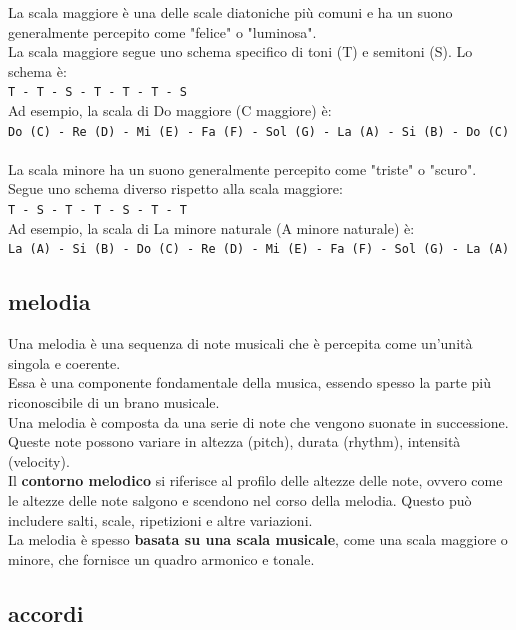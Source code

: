 \documentclass[a4paper,12pt]{report}
\begin{document}
La scala maggiore è una delle scale diatoniche più comuni e ha un suono generalmente percepito come "felice" o "luminosa". \\
La scala maggiore segue uno schema specifico di toni (T) e semitoni (S). Lo schema è: \\
\texttt{T - T - S - T - T - T - S} \\
Ad esempio, la scala di Do maggiore (C maggiore) è: \\
\texttt{Do (C) - Re (D) - Mi (E) - Fa (F) - Sol (G) - La (A) - Si (B) - Do (C)} \\
\\
La scala minore ha un suono generalmente percepito come "triste" o "scuro".  \\
Segue uno schema diverso rispetto alla scala maggiore: \\
\texttt{T - S - T - T - S - T - T} \\
Ad esempio, la scala di La minore naturale (A minore naturale) è: \\
\texttt{La (A) - Si (B) - Do (C) - Re (D) - Mi (E) - Fa (F) - Sol (G) - La (A)} \\

\subsection{melodia}

Una melodia è una sequenza di note musicali che è percepita come un'unità singola e coerente. \\
Essa è una componente fondamentale della musica, essendo spesso la parte più riconoscibile di un brano musicale. \\
Una melodia è composta da una serie di note che vengono suonate in successione. Queste note possono variare in altezza (pitch), durata (rhythm), intensità (velocity). \\
Il \textbf{contorno melodico} si riferisce al profilo delle altezze delle note, ovvero come le altezze delle note salgono e scendono nel corso della melodia. Questo può includere salti, scale, ripetizioni e altre variazioni. \\
La melodia è spesso \textbf{basata su una scala musicale}, come una scala maggiore o minore, che fornisce un quadro armonico e tonale. 

\subsection{accordi}
\end{document}

